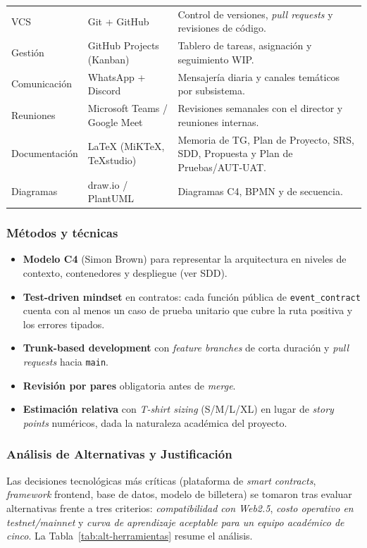 \documentclass[12pt,oneside]{report}
\begin{document}
\begin{longtable}{@{}p{3.3cm} p{4.0cm} p{7.5cm}@{}}
        VCS & Git + GitHub & Control de versiones, \textit{pull requests} y revisiones de código.\\
        Gestión & GitHub Projects (Kanban) & Tablero de tareas, asignación y seguimiento WIP.\\
        Comunicación & WhatsApp + Discord & Mensajería diaria y canales temáticos por subsistema.\\
        Reuniones & Microsoft Teams / Google Meet & Revisiones semanales con el director y reuniones internas.\\
        Documentación & \LaTeX{} (MiKTeX, TeXstudio) & Memoria de TG, Plan de Proyecto, SRS, SDD, Propuesta y Plan de Pruebas/AUT-UAT.\\
        Diagramas & draw.io / PlantUML & Diagramas C4, BPMN y de secuencia.\\
      \end{longtable}

      \subsubsection{Métodos y técnicas}
      \begin{itemize}
        \item \textbf{Modelo C4} (Simon Brown) para representar la arquitectura en niveles de contexto, contenedores y despliegue (ver SDD).
        \item \textbf{Test-driven mindset} en contratos: cada función pública de \texttt{event\_contract} cuenta con al menos un caso de prueba unitario que cubre la ruta positiva y los errores tipados.
        \item \textbf{Trunk-based development} con \textit{feature branches} de corta duración y \textit{pull requests} hacia \texttt{main}.
        \item \textbf{Revisión por pares} obligatoria antes de \textit{merge}.
        \item \textbf{Estimación relativa} con \textit{T-shirt sizing} (S/M/L/XL) en lugar de \textit{story points} numéricos, dada la naturaleza académica del proyecto.
      \end{itemize}

      \subsubsection{Análisis de Alternativas y Justificación}
      \label{subsubsec:analisis-herramientas}

      Las decisiones tecnológicas más críticas (plataforma de \textit{smart contracts}, \textit{framework} frontend, base de datos, modelo de billetera) se tomaron tras evaluar alternativas frente a tres criterios: \emph{compatibilidad con Web2.5}, \emph{costo operativo en testnet/mainnet} y \emph{curva de aprendizaje aceptable para un equipo académico de cinco}. La Tabla~\ref{tab:alt-herramientas} resume el análisis.
\end{document}
